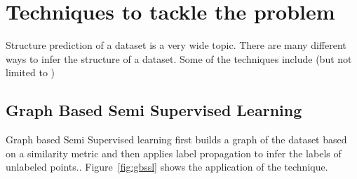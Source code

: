 
\section{Techniques to tackle the problem}

Structure prediction of a dataset is a very wide topic. There are many different ways to infer the structure of a dataset. Some of the techniques include (but not limited to )

\subsection{Graph Based Semi Supervised Learning}
Graph based Semi Supervised learning first builds a graph of the dataset based on a similarity metric and then applies label propagation to infer the labels of unlabeled points.\cite{ssl1}. Figure~\ref{fig:gbssl} shows the application of the technique.

